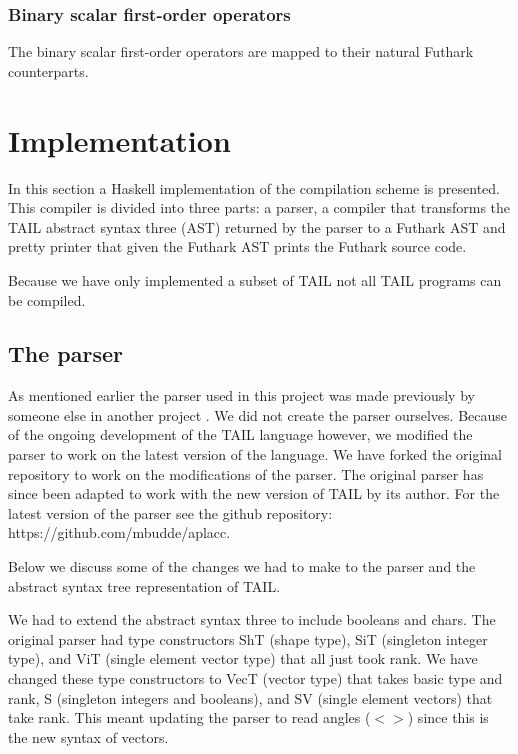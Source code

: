 \documentclass[11pt]{article}
\begin{document}
\subsubsection{Binary scalar first-order operators} 
The binary scalar first-order operators are mapped to their natural Futhark counterparts.

\section{Implementation}
\label{sec:impl}
In this section a Haskell implementation of the compilation scheme is presented.
This compiler is divided into three parts: a parser, a compiler that transforms the TAIL abstract syntax three (AST) returned by the parser to a Futhark AST and pretty printer that given the Futhark AST prints the Futhark source code. 

Because we have only implemented a subset of TAIL not all TAIL programs can be compiled. 

\subsection{The parser}
\label{sec:parser}
As mentioned earlier the parser used in this project was made previously by someone else in another project \cite{APLACC}. We did not create the parser ourselves. 
Because of the ongoing development of the TAIL language however, we modified the parser to work on the latest version of the language. 
We have forked the original repository to work on the modifications of the parser.
The original parser has since been adapted to work with the new version of TAIL by its author. 
For the latest version of the parser see the github repository: https://github.com/mbudde/aplacc. 

Below we discuss some of the changes we had to make to the parser and the abstract syntax tree representation of TAIL.

We had to extend the abstract syntax three to include booleans and chars. 
The original parser had type constructors ShT (shape type), SiT (singleton integer type), and ViT (single element vector type) that all just took rank.
We have changed these type constructors to VecT (vector type) that takes basic type and rank, S (singleton integers and booleans), and SV (single element vectors) that take rank.
This meant updating the parser to read angles ($< >$) since this is the new syntax of vectors.
\end{document}
